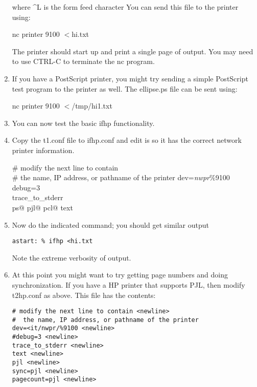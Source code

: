 \documentclass[a4paper]{article}
\begin{document}
\begin{enumerate}
where {\ttfamily \^{}L} is the form feed character
You can send this file to the printer using:
\begin{tscreen}
nc printer 9100 $<$hi.txt
\end{tscreen}

The printer should start up and print a single page of output.
You may need to use
{\ttfamily CTRL-C} to 
terminate the
{\ttfamily nc}
program.

\item If you have a PostScript printer,
you might try sending a simple PostScript test program to the printer
as well.
The
{\ttfamily ellipse.ps}
file can be sent using:
\begin{tscreen}
nc printer 9100 $<$/tmp/hi1.txt
\end{tscreen}
\item You can now test the basic
{\ttfamily ifhp}
functionality.
\item Copy the
{\ttfamily t1.conf}
file to
{\ttfamily ifhp.conf}
and edit is so it has the correct network printer information.
\begin{tscreen}
\# modify the next line to contain \\ 
\#  the name, IP address, or pathname of the printer
dev={\itshape nwpr\/}\%9100 \\ 
debug=3 \\ 
trace\_to\_stderr \\ 
ps@
pjl@
pcl@
text 
\end{tscreen}
\item Now do the indicated command; you should get similar output
\begin{tscreen}
\begin{verbatim}
astart: % ifhp <hi.txt
\end{verbatim}
\end{tscreen}

Note the extreme verbosity of output.
\item At this point you might want to try getting page numbers and doing
synchronization.
If you have a HP printer that supports PJL,
then modify
{\ttfamily t2hp.conf} as above.
This file has the contents:
\begin{tscreen}
\begin{verbatim}
# modify the next line to contain <newline>
#  the name, IP address, or pathname of the printer
dev=<it/nwpr/%9100 <newline>
#debug=3 <newline>
trace_to_stderr <newline>
text <newline>
pjl <newline>
sync=pjl <newline>
pagecount=pjl <newline>
\end{verbatim}
\end{tscreen}


\end{enumerate}
\end{document}
